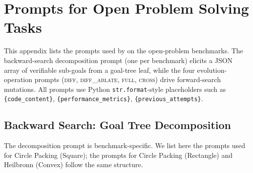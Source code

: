 \section{Prompts for Open Problem Solving Tasks}
\label{app:prompts}

This appendix lists the prompts used by \ours{} on the open-problem
benchmarks. The backward-search decomposition prompt (one per benchmark)
elicits a JSON array of verifiable sub-goals from a goal-tree leaf, while the
four evolution-operation prompts (\textsc{diff}, \textsc{diff\_ablate},
\textsc{full}, \textsc{cross}) drive forward-search mutations. All prompts
use Python \texttt{str.format}-style placeholders such as
\texttt{\{code\_content\}}, \texttt{\{performance\_metrics\}},
\texttt{\{previous\_attempts\}}.

\subsection{Backward Search: Goal Tree Decomposition}
\label{app:prompts:backward}

The decomposition prompt is benchmark-specific. We list here the
prompts used for Circle Packing (Square); the prompts for Circle Packing (Rectangle) and Heilbronn (Convex) follow the same structure.

